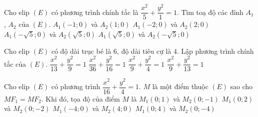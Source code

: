 \begin{ex}%
	Cho elip $(E)$ có phương trình chính tắc là $\dfrac{x^2}{5}+\dfrac{y^2}{1}=1$. Tìm toạ độ các đỉnh  $A_1$, $A_2$  của $(E)$.
	\choice
	{ $A_1(-1;0)$ và $A_2(1;0)$}
	{$A_1(-2;0)$ và $A_2(2;0)$}
	{\True $A_1(-\sqrt{5};0)$ và $A_2(\sqrt{5};0)$}
	{$A_1(\sqrt{5};0)$ và $A_2(-\sqrt{5};0)$}
\end{ex}



\begin{ex}%
	Cho elip $(E)$ có  độ dài trục bé là $6$, độ dài tiêu cự  là $4$. Lập phương trình chính tắc của $(E)$.
	\choice
	{ \True $\dfrac{x^2}{13}+\dfrac{y^2}{9}=1$}
	{$\dfrac{x^2}{36}+\dfrac{y^2}{16}=1$}
	{ $\dfrac{x^2}{9}+\dfrac{y^2}{4}=1$}
	{$\dfrac{x^2}{9}+\dfrac{y^2}{13}=1$}
\end{ex}

\begin{ex}%
	Cho elip $(E)$ có phương trình $\dfrac{x^2}{16}+\dfrac{y^2}{4}=1$. $M$ là một điểm thuộc $(E)$ sao cho $MF_1=MF_2$. Khi đó, tọa độ của điểm $M$ là
	\choice
	{ $M_1(0;1)$ và $M_2(0;-1)$}
	{ \True $M_1(0;2)$ và $M_2(0;-2)$}
	{ $M_1(-4;0)$ và $M_2(4;0)$}
	{ $M_1(0;4)$ và $M_2(0;-4)$}
\end{ex}

